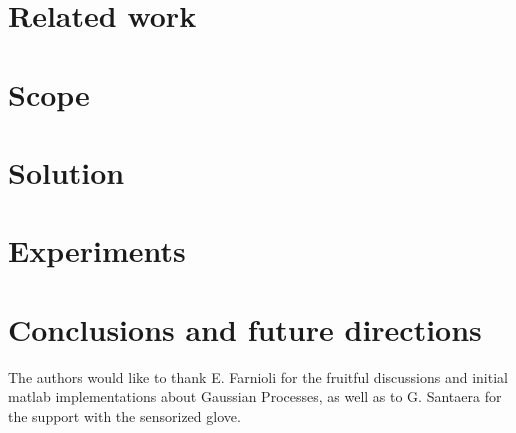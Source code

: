 \section{Related work}
\label{sec:related}



\section{Scope}
\label{sec:scope}



\section{Solution}
\label{sec:solution}



\section{Experiments}
\label{sec:experiments}



\section{Conclusions and future directions}
\label{sec:conclusions}



\begin{acknowledgements}
The authors would like to thank E. Farnioli for the fruitful discussions and 
initial matlab implementations about Gaussian Processes, as well as to G. 
Santaera for the support with the sensorized glove.
\end{acknowledgements}






